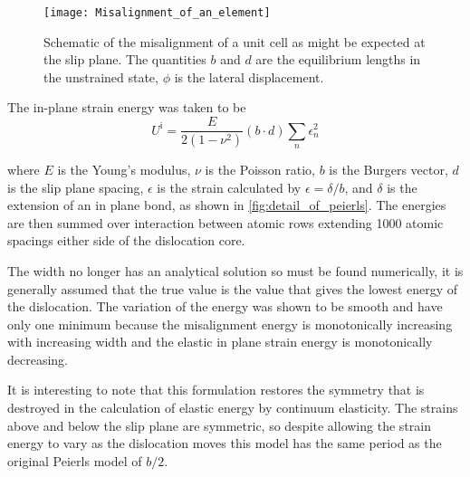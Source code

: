 \begin{figure}
\centering
\texttt{[image: Misalignment\_of\_an\_element]}
\captionsetup{width=0.5\textwidth}
\caption[Schematic of a misaligned unit cell]{Schematic of the misalignment of a unit cell as might be expected at the slip plane. The quantities $b$ and $d$ are the equilibrium lengths in the unstrained state, $\phi$ is the lateral displacement. \label{fig:schematic_misalignment}}
\end{figure}

The in-plane strain energy was taken to be 
\begin{equation}
U^{\text{i}} = \frac{E}{2(1-\nu^2)} (b\cdot d) \sum_n \epsilon_n^2
\end{equation}

where $E$ is the Young's modulus, $\nu$ is the Poisson ratio, $b$ is the Burgers vector, $d$ is the slip plane spacing, $\epsilon$ is the strain calculated by $\epsilon = \delta/b$, and $\delta$ is the extension of an in plane bond, as shown in \autoref{fig:detail_of_peierls}. The energies are then summed over interaction between atomic rows extending 1000 atomic spacings either side of the dislocation core.

The width no longer has an analytical solution so must be found numerically, it is generally assumed that the true value is the value that gives the lowest energy of the dislocation. The variation of the energy was shown to be smooth and have only one minimum because the misalignment energy is monotonically increasing with increasing width and the elastic in plane strain energy is monotonically decreasing.

It is interesting to note that this formulation restores the symmetry that is destroyed in the calculation of elastic energy by continuum elasticity. The strains above and below the slip plane are symmetric, so despite allowing the strain energy to vary as the dislocation moves this model has the same period as the original Peierls model of $b/2$.










































